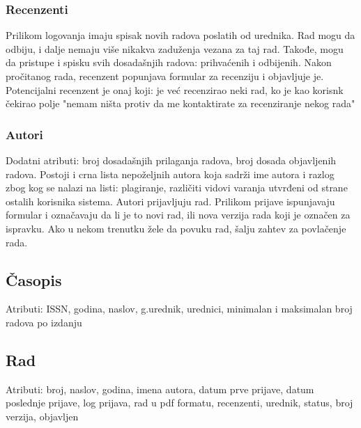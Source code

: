 \documentclass[a4paper]{article}
\begin{document}
    \subsubsection{Recenzenti}
    Prilikom logovanja imaju spisak novih radova poslatih od urednika. Rad mogu da odbiju, i dalje nemaju više nikakva zaduženja vezana za taj rad. Takođe, mogu da pristupe i spisku svih dosadašnjih radova: prihvaćenih i odbijenih. Nakon pročitanog rada, recenzent popunjava formular za recenziju i objavljuje je. Potencijalni recenzent je onaj koji: je već recenzirao neki rad, ko je  kao korisnk čekirao polje "nemam ništa protiv da me kontaktirate za recenziranje nekog rada"

    \subsubsection{Autori}
    Dodatni atributi: broj dosadašnjih prilaganja radova, broj dosada objavljenih radova. Postoji i crna lista nepoželjnih autora koja sadrži ime autora i razlog zbog kog se nalazi na listi:  plagiranje, različiti vidovi varanja utvrđeni od strane ostalih korisnika sistema. Autori prijavljuju rad. Prilikom prijave ispunjavaju formular i označavaju da li je to novi rad, ili nova verzija rada koji je označen za ispravku. Ako u nekom trenutku žele da povuku rad, šalju zahtev za povlačenje rada.

\subsection{Časopis}
Atributi: ISSN, godina, naslov, g.urednik, urednici, minimalan i maksimalan broj radova po izdanju

\subsection{Rad}
    Atributi: broj, naslov, godina, imena autora, datum prve prijave, datum poslednje prijave, log prijava, rad u pdf formatu, recenzenti, urednik, status, broj verzija, objavljen
\end{document}
